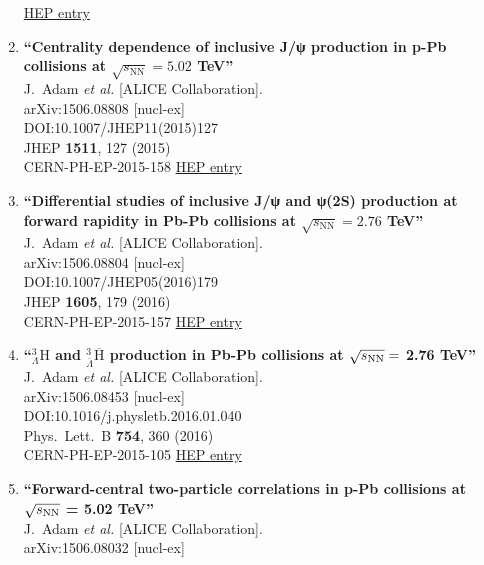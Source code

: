 \begin{enumerate}
\href{http://inspirehep.net/record/1380453}{HEP entry}
\item%
{\bf ``Centrality dependence of inclusive J/ψ production in p-Pb collisions at $ \sqrt{s_{\mathrm{NN}}}=5.02 $ TeV''}
  \\{}J.~Adam {\it et al.} [ALICE Collaboration].
  \\{}arXiv:1506.08808 [nucl-ex]
  \\{}DOI:10.1007/JHEP11(2015)127
  \\{}JHEP {\bf 1511}, 127 (2015)
  \\{}CERN-PH-EP-2015-158
\href{http://inspirehep.net/record/1380193}{HEP entry}
\item%
{\bf ``Differential studies of inclusive J/ψ and ψ(2S) production at forward rapidity in Pb-Pb collisions at $ \sqrt{s_{\mathrm{NN}}}=2.76 $ TeV''}
  \\{}J.~Adam {\it et al.} [ALICE Collaboration].
  \\{}arXiv:1506.08804 [nucl-ex]
  \\{}DOI:10.1007/JHEP05(2016)179
  \\{}JHEP {\bf 1605}, 179 (2016)
  \\{}CERN-PH-EP-2015-157
\href{http://inspirehep.net/record/1380192}{HEP entry}
\item%
{\bf ``$^{3}_{\Lambda}\mathrm H$ and $^{3}_{\bar{\Lambda}} \overline{\mathrm H}$ production in Pb-Pb collisions at $\sqrt{s_{\rm NN}} =$ 2.76 TeV''}
  \\{}J.~Adam {\it et al.} [ALICE Collaboration].
  \\{}arXiv:1506.08453 [nucl-ex]
  \\{}DOI:10.1016/j.physletb.2016.01.040
  \\{}Phys.\ Lett.\ B {\bf 754}, 360 (2016)
  \\{}CERN-PH-EP-2015-105
\href{http://inspirehep.net/record/1380234}{HEP entry}
\item%
{\bf ``Forward-central two-particle correlations in p-Pb collisions at $\sqrt{s_{\rm NN}}$ = 5.02 TeV''}
  \\{}J.~Adam {\it et al.} [ALICE Collaboration].
  \\{}arXiv:1506.08032 [nucl-ex]

\end{enumerate}
